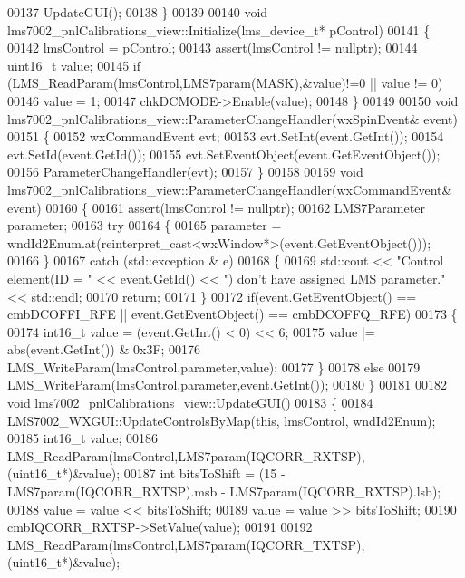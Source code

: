 \begin{DoxyCode}
{{{{00137     UpdateGUI();
00138 \}
00139 
00140 \textcolor{keywordtype}{void} lms7002_pnlCalibrations_view::Initialize(lms_device_t* pControl)
00141 \{
00142     lmsControl = pControl;
00143     assert(lmsControl != \textcolor{keyword}{nullptr});
00144     uint16\_t value;
00145     \textcolor{keywordflow}{if} (LMS_ReadParam(lmsControl,LMS7param(MASK),&value)!=0  || value != 0)
00146         value = 1;
00147     chkDCMODE->Enable(value);
00148 \}
00149 
00150 \textcolor{keywordtype}{void} lms7002_pnlCalibrations_view::ParameterChangeHandler(wxSpinEvent& event)
00151 \{
00152     wxCommandEvent evt;
00153     evt.SetInt(event.GetInt());
00154     evt.SetId(event.GetId());
00155     evt.SetEventObject(event.GetEventObject());
00156     ParameterChangeHandler(evt);
00157 \}
00158 
00159 \textcolor{keywordtype}{void} lms7002_pnlCalibrations_view::ParameterChangeHandler(wxCommandEvent& event)
00160 \{
00161     assert(lmsControl != \textcolor{keyword}{nullptr});
00162     LMS7Parameter parameter;
00163     \textcolor{keywordflow}{try}
00164     \{
00165         parameter = wndId2Enum.at(reinterpret\_cast<wxWindow*>(event.GetEventObject()));
00166     \}
00167     \textcolor{keywordflow}{catch} (std::exception & e)
00168     \{
00169         std::cout << \textcolor{stringliteral}{"Control element(ID = "} << \textcolor{keyword}{event}.GetId() << \textcolor{stringliteral}{") don't have assigned LMS parameter."} << 
      std::endl;
00170         \textcolor{keywordflow}{return};
00171     \}
00172     \textcolor{keywordflow}{if}(event.GetEventObject() == cmbDCOFFI_RFE || \textcolor{keyword}{event}.GetEventObject() == 
      cmbDCOFFQ_RFE)
00173     \{
00174         int16\_t value = (\textcolor{keyword}{event}.GetInt() < 0) << 6;
00175         value |= abs(event.GetInt()) & 0x3F;
00176         LMS_WriteParam(lmsControl,parameter,value);
00177     \}
00178     \textcolor{keywordflow}{else}
00179         LMS_WriteParam(lmsControl,parameter,event.GetInt());
00180 \}
00181 
00182 \textcolor{keywordtype}{void} lms7002_pnlCalibrations_view::UpdateGUI()
00183 \{
00184     LMS7002_WXGUI::UpdateControlsByMap(\textcolor{keyword}{this}, lmsControl, wndId2Enum);
00185     int16\_t value;
00186     LMS_ReadParam(lmsControl,LMS7param(IQCORR_RXTSP),(uint16\_t*)&value);
00187     \textcolor{keywordtype}{int} bitsToShift = (15 - LMS7param(IQCORR_RXTSP).msb - LMS7param(IQCORR_RXTSP).lsb);
00188     value = value << bitsToShift;
00189     value = value >> bitsToShift;
00190     cmbIQCORR_RXTSP->SetValue(value);
00191 
00192     LMS_ReadParam(lmsControl,LMS7param(IQCORR_TXTSP),(uint16\_t*)&value);
}}}}
\end{DoxyCode}
